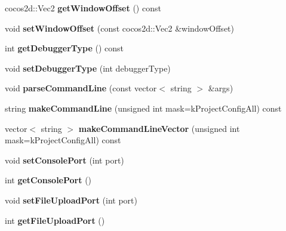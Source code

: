 \begin{DoxyCompactItemize}
cocos2d\+::\+Vec2 {\bfseries get\+Window\+Offset} () const
\item 
\mbox{\label{classProjectConfig_af988294505d0e6083cec014bec4281ab}} 
void {\bfseries set\+Window\+Offset} (const cocos2d\+::\+Vec2 \&window\+Offset)
\item 
\mbox{\label{classProjectConfig_aadf71fe84b8debee6de4115c489baf3e}} 
int {\bfseries get\+Debugger\+Type} () const
\item 
\mbox{\label{classProjectConfig_a4d63af115eaa6775bf225e3f2d48d1ab}} 
void {\bfseries set\+Debugger\+Type} (int debugger\+Type)
\item 
\mbox{\label{classProjectConfig_ae7c768afc18587b80aafc3e0651309ef}} 
void {\bfseries parse\+Command\+Line} (const vector$<$ string $>$ \&args)
\item 
\mbox{\label{classProjectConfig_a4accfa098255c2f65a6d0adecf3f0bc1}} 
string {\bfseries make\+Command\+Line} (unsigned int mask=k\+Project\+Config\+All) const
\item 
\mbox{\label{classProjectConfig_a26868b56562f9258660bf20076c3c10e}} 
vector$<$ string $>$ {\bfseries make\+Command\+Line\+Vector} (unsigned int mask=k\+Project\+Config\+All) const
\item 
\mbox{\label{classProjectConfig_a4e29923c8a72510b9dce9c1b1be68d60}} 
void {\bfseries set\+Console\+Port} (int port)
\item 
\mbox{\label{classProjectConfig_a4fedc38204aae13b344cf285b53c7404}} 
int {\bfseries get\+Console\+Port} ()
\item 
\mbox{\label{classProjectConfig_a93ff0f7bd719f405ec20af9413d90e0b}} 
void {\bfseries set\+File\+Upload\+Port} (int port)
\item 
\mbox{\label{classProjectConfig_ae5db6e948707ed2cab065cbb30c95639}} 
int {\bfseries get\+File\+Upload\+Port} ()
\item 
\mbox{\label{classProjectConfig_ae1ef573a921de1aeaf7d3f9e80674ae8}} 

\end{DoxyCompactItemize}
